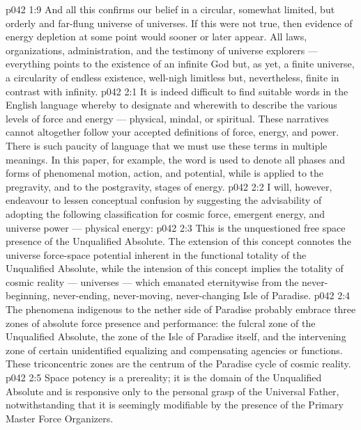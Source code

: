 \vs p042 1:9 \pc And all this confirms our belief in a circular, somewhat limited, but orderly and far\hyp{}flung universe of universes. If this were not true, then evidence of energy depletion at some point would sooner or later appear. All laws, organizations, administration, and the testimony of universe explorers --- everything points to the existence of an infinite God but, as yet, a finite universe, a circularity of endless existence, well\hyp{}nigh limitless but, nevertheless, finite in contrast with infinity.
\vs p042 2:1 It is indeed difficult to find suitable words in the English language whereby to designate and wherewith to describe the various levels of force and energy --- physical, mindal, or spiritual. These narratives cannot altogether follow your accepted definitions of force, energy, and power. There is such paucity of language that we must use these terms in multiple meanings. In this paper, for example, the word  is used to denote all phases and forms of phenomenal motion, action, and potential, while  is applied to the pregravity, and  to the postgravity, stages of energy.
\vs p042 2:2 I will, however, endeavour to lessen conceptual confusion by suggesting the advisability of adopting the following classification for cosmic force, emergent energy, and universe power --- physical energy:
\vs p042 2:3 \bibnobreakspace {} This is the unquestioned free space presence of the Unqualified Absolute. The extension of this concept connotes the universe force\hyp{}space potential inherent in the functional totality of the Unqualified Absolute, while the intension of this concept implies the totality of cosmic reality --- universes --- which emanated eternitywise from the never\hyp{}beginning, never\hyp{}ending, never\hyp{}moving, never\hyp{}changing Isle of Paradise.
\vs p042 2:4 The phenomena indigenous to the nether side of Paradise probably embrace three zones of absolute force presence and performance: the fulcral zone of the Unqualified Absolute, the zone of the Isle of Paradise itself, and the intervening zone of certain unidentified equalizing and compensating agencies or functions. These triconcentric zones are the centrum of the Paradise cycle of cosmic reality.
\vs p042 2:5 Space potency is a prereality; it is the domain of the Unqualified Absolute and is responsive only to the personal grasp of the Universal Father, notwithstanding that it is seemingly modifiable by the presence of the Primary Master Force Organizers.
